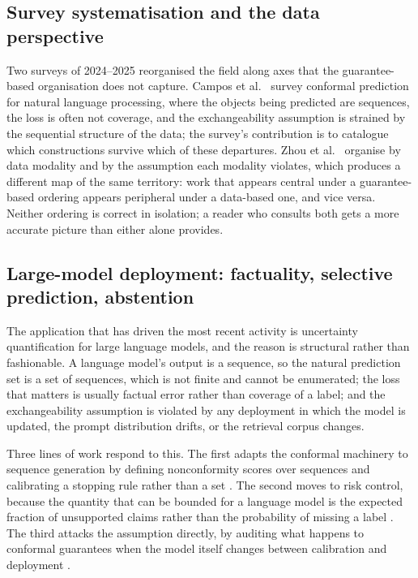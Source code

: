 \documentclass[a4paper,longmktitle]{cas-sc}
\begin{document}
\subsection{Survey systematisation and the data perspective}

Two surveys of 2024--2025 reorganised the field along axes that the guarantee-based organisation does not capture. Campos et al.\ \cite{Campos2024} survey conformal prediction for natural language processing, where the objects being predicted are sequences, the loss is often not coverage, and the exchangeability assumption is strained by the sequential structure of the data; the survey's contribution is to catalogue which constructions survive which of these departures. Zhou et al.\ \cite{Zhou2025} organise by data modality and by the assumption each modality violates, which produces a different map of the same territory: work that appears central under a guarantee-based ordering appears peripheral under a data-based one, and vice versa. Neither ordering is correct in isolation; a reader who consults both gets a more accurate picture than either alone provides.

\subsection{Large-model deployment: factuality, selective prediction, abstention}

The application that has driven the most recent activity is uncertainty quantification for large language models, and the reason is structural rather than fashionable. A language model's output is a sequence, so the natural prediction set is a set of sequences, which is not finite and cannot be enumerated; the loss that matters is usually factual error rather than coverage of a label; and the exchangeability assumption is violated by any deployment in which the model is updated, the prompt distribution drifts, or the retrieval corpus changes.

Three lines of work respond to this. The first adapts the conformal machinery to sequence generation by defining nonconformity scores over sequences and calibrating a stopping rule rather than a set \cite{ConformalLM}. The second moves to risk control, because the quantity that can be bounded for a language model is the expected fraction of unsupported claims rather than the probability of missing a label \cite{CRC_LLM}. The third attacks the assumption directly, by auditing what happens to conformal guarantees when the model itself changes between calibration and deployment \cite{AuditCP}.
\end{document}
